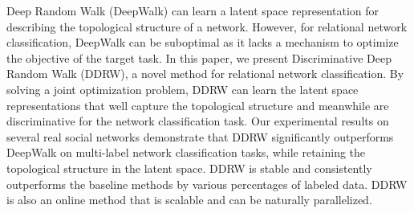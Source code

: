 Deep Random Walk (DeepWalk) can learn a latent space representation for describing the topological structure of a network. However, for relational network classification, DeepWalk can be suboptimal as it lacks a mechanism to optimize the objective of the target task. In this paper, we present Discriminative Deep Random Walk (DDRW), a novel method for relational network classification. By solving a joint optimization problem, DDRW can learn the latent space representations that well capture the topological structure and meanwhile are discriminative for the network classification task. Our experimental results on several real social networks demonstrate that DDRW significantly outperforms DeepWalk on multi-label network classification tasks, while retaining the topological structure in the latent space. DDRW is stable and consistently outperforms the baseline methods by various percentages of labeled data. DDRW is also an online method that is scalable and can be naturally parallelized.
